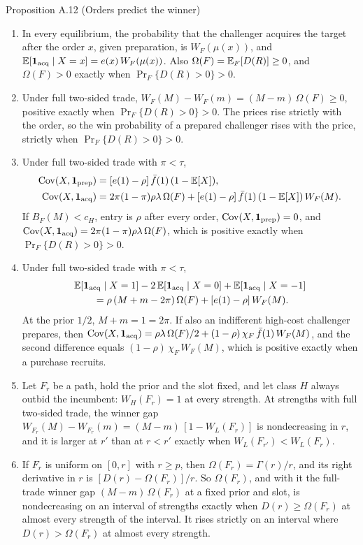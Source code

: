\begin{paperresult}{Proposition A.12 (Orders predict the winner)}
\begin{enumerate}[label=(\roman*),leftmargin=2em]
\item In every equilibrium, the probability that the challenger acquires the target after the order \(x\), given preparation, is \(W_F(\mu(x))\), and \(\mathbb{E}[\mathbf{1}_{\rm acq}\mid X=x]=e(x)\,W_F(\mu(x))\). Also \(\Omega(F)=\mathbb{E}_F[D(R)]\ge0\), and \(\Omega(F)>0\) exactly when \(\Pr_F\{D(R)>0\}>0\).
\item Under full two-sided trade, \(W_F(M)-W_F(m)=(M-m)\,\Omega(F)\ge0\), positive exactly when \(\Pr_F\{D(R)>0\}>0\). The prices rise strictly with the order, so the win probability of a prepared challenger rises with the price, strictly when \(\Pr_F\{D(R)>0\}>0\).
\item Under full two-sided trade with \(\pi<\tau\),
\begin{align*}
\operatorname{Cov}(X,\mathbf{1}_{\rm prep})&=[e(1)-\rho]\,\bar f(1)\,(1-\mathbb{E}[X]),\\
\operatorname{Cov}(X,\mathbf{1}_{\rm acq})&=2\pi(1-\pi)\rho\lambda\,\Omega(F)+[e(1)-\rho]\,\bar f(1)\,(1-\mathbb{E}[X])\,W_F(M).
\end{align*}
If \(B_F(M)<c_H\), entry is \(\rho\) after every order, \(\operatorname{Cov}(X,\mathbf{1}_{\rm prep})=0\), and \(\operatorname{Cov}(X,\mathbf{1}_{\rm acq})=2\pi(1-\pi)\rho\lambda\,\Omega(F)\), which is positive exactly when \(\Pr_F\{D(R)>0\}>0\).
\item Under full two-sided trade with \(\pi<\tau\),
\begin{align*}
&\mathbb{E}[\mathbf{1}_{\rm acq}\mid X=1]-2\,\mathbb{E}[\mathbf{1}_{\rm acq}\mid X=0]+\mathbb{E}[\mathbf{1}_{\rm acq}\mid X=-1]\\
&\qquad=\rho\,(M+m-2\pi)\,\Omega(F)+[e(1)-\rho]\,W_F(M).
\end{align*}
At the prior \(1/2\), \(M+m=1=2\pi\). If also an indifferent high-cost challenger prepares, then \(\operatorname{Cov}(X,\mathbf{1}_{\rm acq})=\rho\lambda\,\Omega(F)/2+(1-\rho)\,\chi_F\,\bar f(1)\,W_F(M)\), and the second difference equals \((1-\rho)\,\chi_F\,W_F(M)\), which is positive exactly when a purchase recruits.
\item Let \(F_r\) be a path, hold the prior and the slot fixed, and let class \(H\) always outbid the incumbent: \(W_H(F_r)=1\) at every strength. At strengths with full two-sided trade, the winner gap \(W_{F_r}(M)-W_{F_r}(m)=(M-m)\,[1-W_L(F_r)]\) is nondecreasing in \(r\), and it is larger at \(r'\) than at \(r<r'\) exactly when \(W_L(F_{r'})<W_L(F_r)\).
\item If \(F_r\) is uniform on \([0,r]\) with \(r\ge p\), then \(\Omega(F_r)=\Gamma(r)/r\), and its right derivative in \(r\) is \([D(r)-\Omega(F_r)]/r\). So \(\Omega(F_r)\), and with it the full-trade winner gap \((M-m)\,\Omega(F_r)\) at a fixed prior and slot, is nondecreasing on an interval of strengths exactly when \(D(r)\ge\Omega(F_r)\) at almost every strength of the interval. It rises strictly on an interval where \(D(r)>\Omega(F_r)\) at almost every strength.
\end{enumerate}
\end{paperresult}

